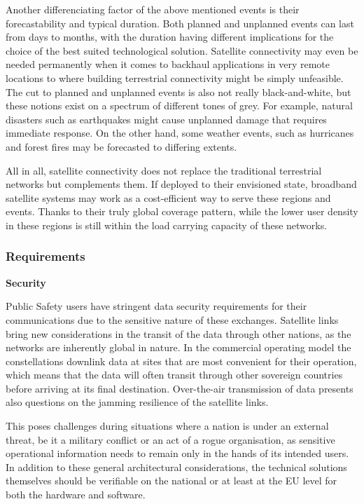 \documentclass[english, 12pt, a4paper, elec, utf8, a-1b, online]{aaltothesis}
\begin{document}
Another differenciating factor of the above mentioned events is their forecastability and typical duration. Both planned and unplanned events can last from days to months, with the duration having different implications for the choice of the best suited technological solution. Satellite connectivity may even be needed permanently when it comes to backhaul applications in very remote locations to where building terrestrial connectivity might be simply unfeasible.
The cut to planned and unplanned events is also not really black-and-white, but these notions exist on a spectrum of different tones of grey. For example, natural disasters such as earthquakes might cause unplanned damage that requires immediate response. On the other hand, some weather events, such as hurricanes and forest fires may be forecasted to differing extents.

All in all, satellite connectivity does not replace the traditional terrestrial networks but complements them. If deployed to their envisioned state, broadband satellite systems may work as a cost-efficient way to serve these regions and events. Thanks to their truly global coverage pattern, while the lower user density in these regions is still within the load carrying capacity of these networks.

\subsubsection{Requirements}

\textbf{Security}

Public Safety users have stringent data security requirements for their communications due to the sensitive nature of these exchanges. Satellite links bring new considerations in the transit of the data through other nations, as the networks are inherently global in nature. In the commercial operating model the constellations downlink data at sites that are most convenient for their operation, which means that the data will often transit through other sovereign countries before arriving at its final destination. Over-the-air transmission of data presents also questions on the jamming resilience of the satellite links.

This poses challenges during situations where a nation is under an external threat, be it a military conflict or an act of a rogue organisation, as sensitive operational information needs to remain only in the hands of its intended users. In addition to these general architectural considerations, the technical solutions themselves should be verifiable on the national or at least at the EU level for both the hardware and software.
\end{document}
